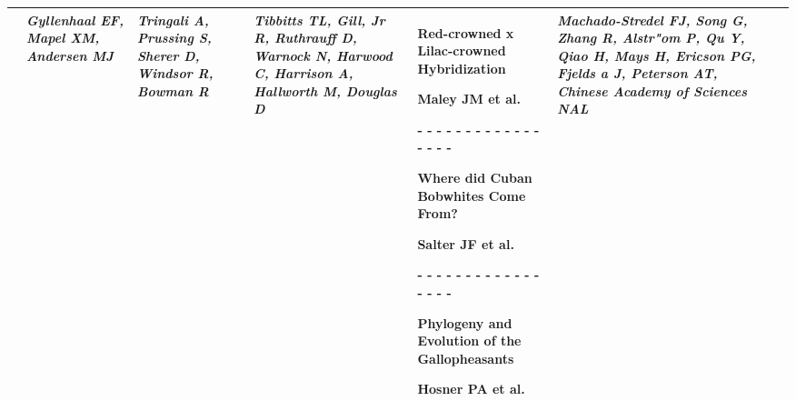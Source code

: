 \begin{tabular}{|x{0.8cm}|x{2.65cm}|x{2.65cm}|a{2.65cm}|y{2.65cm}|x{2.65cm}|x{2.65cm}|@{}m{0pt}@{}}
& \par \vspace{8pt} \textit{Gyllenhaal EF, Mapel XM, Andersen MJ} &  \par \vspace{8pt} \textit{Tringali A, Prussing S, Sherer D, Windsor R, Bowman R} &  \par \vspace{8pt} \textit{Tibbitts TL, Gill, Jr R, Ruthrauff D, Warnock N, Harwood C, Harrison A, Hallworth M, Douglas D} & \scriptsize Red-crowned x Lilac-crowned Hybridization\par \tiny Maley JM et al.\par - - - - - - - - - - - - - - - - - \par \vspace{2pt} \scriptsize Where did Cuban Bobwhites Come From?\par \tiny Salter JF et al.\par - - - - - - - - - - - - - - - - - \par \vspace{2pt} \scriptsize Phylogeny and Evolution of the Gallopheasants\par \tiny Hosner PA et al. &  \par \vspace{8pt} \textit{Machado-Stredel FJ, Song G, Zhang R, Alstr"{o}m P, Qu Y, Qiao H, Mays H, Ericson PG, Fjelds
{a} J, Peterson AT, Chinese Academy of Sciences NAL} &  \par \vspace{8pt} \textit{}&\\[25ex]
\hline

\end{tabular}
